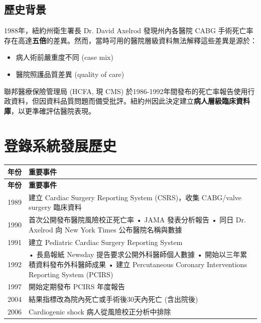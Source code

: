 \documentclass[12pt,a4paper]{article}
\begin{document}
\subsection{歷史背景}

1988年，紐約州衛生署長 Dr. David Axelrod 發現州內各醫院 CABG 手術死亡率存在高達\textbf{五倍}的差異。然而，當時可用的醫院層級資料無法解釋這些差異是源於：
\begin{itemize}
    \item 病人術前嚴重度不同 (case mix)
    \item 醫院照護品質差異 (quality of care)
\end{itemize}

聯邦醫療保險管理局 (HCFA, 現 CMS) 於1986-1992年間發布的死亡率報告使用行政資料，但因資料品質問題而備受批評。紐約州因此決定建立\textbf{病人層級臨床資料庫}，以更準確評估醫院表現。

\section{登錄系統發展歷史}

\begin{longtable}{p{2.5cm}p{11.5cm}}
\toprule
\textbf{年份} & \textbf{重要事件} \\
\midrule
\endfirsthead

\toprule
\textbf{年份} & \textbf{重要事件} \\
\midrule
\endhead

\bottomrule
\endfoot

1989 & 建立 Cardiac Surgery Reporting System (CSRS)，收集 CABG/valve surgery 臨床資料 \\
\midrule
1990 & 首次公開發布醫院風險校正死亡率\newline
• JAMA 發表分析報告\newline
• 同日 Dr. Axelrod 向 New York Times 公布醫院名稱與數據 \\
\midrule
1991 & 建立 Pediatric Cardiac Surgery Reporting System \\
\midrule
1992 & • 長島報紙 Newsday 提告要求公開外科醫師個人數據\newline
• 開始以三年累積資料發布外科醫師成果\newline
• 建立 Percutaneous Coronary Interventions Reporting System (PCIRS) \\
\midrule
1997 & 開始定期發布 PCIRS 年度報告 \\
\midrule
2004 & 結果指標改為院內死亡或手術後30天內死亡 (含出院後) \\
\midrule
2006 & Cardiogenic shock 病人從風險校正分析中排除 \\
\bottomrule
\end{longtable}
\end{document}

